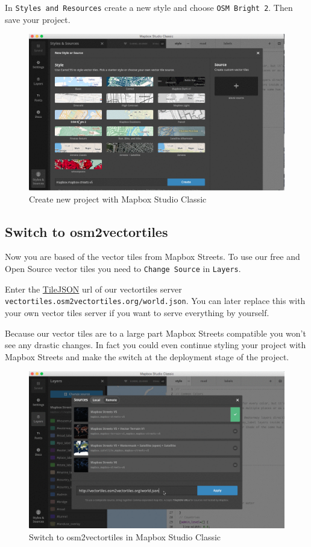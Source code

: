In \texttt{Styles\ and\ Resources} create a new style and choose
\texttt{OSM\ Bright\ 2}. Then save your project.

\begin{figure}[H]
\centering
\includegraphics[width=1\textwidth]{images/mapbox_classic_create_project.png}
\caption{Create new project with Mapbox Studio Classic}
\end{figure}

\subsection{Switch to osm2vectortiles}\label{switch-to-osm2vectortiles}

Now you are based of the vector tiles from Mapbox Streets. To use our
free and Open Source vector tiles you need to \texttt{Change\ Source} in
\texttt{Layers}.

Enter the \href{https://github.com/mapbox/tilejson-spec}{TileJSON} url
of our vectortiles server
\texttt{vectortiles.osm2vectortiles.org/world.json}. You can later
replace this with your own vector tiles server if you want to serve
everything by yourself.

Because our vector tiles are to a large part Mapbox Streets compatible
you won't see any drastic changes. In fact you could even continue
styling your project with Mapbox Streets and make the switch at the
deployment stage of the project.

\begin{figure}[htbp]
\centering
\includegraphics[width=1\textwidth]{images/mapbox_classic_switch_osm2vectortiles.png}
\caption{Switch to osm2vectortiles in Mapbox Studio Classic}
\end{figure}

